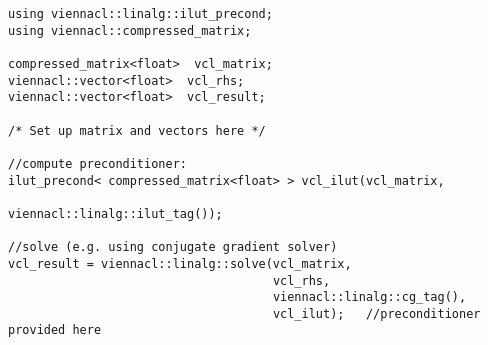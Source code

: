 
\begin{lstlisting}
using viennacl::linalg::ilut_precond;
using viennacl::compressed_matrix;

compressed_matrix<float>  vcl_matrix;
viennacl::vector<float>  vcl_rhs;
viennacl::vector<float>  vcl_result;

/* Set up matrix and vectors here */

//compute preconditioner:
ilut_precond< compressed_matrix<float> > vcl_ilut(vcl_matrix,
                                                  viennacl::linalg::ilut_tag());

//solve (e.g. using conjugate gradient solver)
vcl_result = viennacl::linalg::solve(vcl_matrix,
                                     vcl_rhs,
                                     viennacl::linalg::cg_tag(),
                                     vcl_ilut);   //preconditioner provided here
\end{lstlisting}

% 
% 
% 
% 
% 
% 
% 


